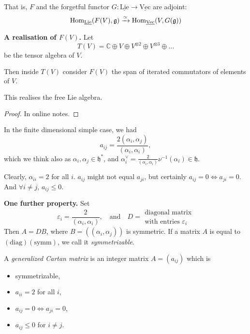 That is, $F$ and the
forgetful functor
$G:\underline{\text{Lie}}\to
\underline{\text{Vec}}$
are adjoint:
$$
\mathop{\mathrm{Hom}}\nolimits_{\underline{\text{Lie}}}(F(V),
\mathfrak{g})
\xrightarrow{\simeq }
\mathop{\mathrm{Hom}}\nolimits_{\underline{\text{Vec}}}(V,
G(\mathfrak{g}))
$$

\medskip\noindent
{\bf A realisation of $F(V)$.} Let
$$
T(V)=\mathbb{C} \oplus V \oplus V^{\otimes
2}\oplus V^{\otimes 3}\oplus\ldots
$$
be the tensor algebra of $V$.

Then inside $T(V)$ consider $F(V)$ the span
of iterated commutators of elements
of  $V$.

\begin{proposition}
\label{proposition-reali-free-lie-algeb}
This realises the free Lie algebra.
\end{proposition}

\begin{proof}
In online notes.
\end{proof}

\medskip\noindent
In the finite dimensional simple case, we had
$$
a_{ij}=\frac{2(\alpha_i,\alpha_j)}{(\alpha_i,
\alpha_i)},
$$
which we think also as $\alpha_i,\alpha_j \in
\mathfrak{h}^*$,
and
$\alpha_i^\vee=\frac{2}{(\alpha_i,\alpha_i)}
\nu^{-1}(\alpha_i)
\in \mathfrak{h}.$

Clearly, $\alpha_{ii}=2$ for all $i$.
$a_{ij}$ might not equal $a_{ji}$, but
certainly $a_{ij}=0 \iff a_{ji}=0$.
And $\forall  i \neq j$, $a_{ij} \leq 0$.

\medskip\noindent
{\bf One further property.} Set
$$
\varepsilon_i=\frac{2}{(\alpha_i,\alpha_i)},
\quad
\text{and}\quad
D=\substack{\text{diagonal matrix} \\
\text{with entries }\varepsilon_i}
$$
Then $A=DB$, where $B=((\alpha_i,\alpha_j))$
is symmetric.
If a matrix $A$ is equal to
$(\text{diag})(\text{symm})$, we call it
 {\it symmetrizable}.

\begin{definition}
\label{definition-generalized-Cartan-matrix}
A {\it generalized Cartan matrix} is an
integer matrix $A=(a_{ij})$
which is
\begin{itemize}
\item symmetrizable,
\item $a_{ii}=2$ for all $i$,
\item $a_{ij}=0 \iff a_{ji}=0$,
\item $a_{ij}\leq 0$ for $i \neq j$.
\end{itemize}
\end{definition}

